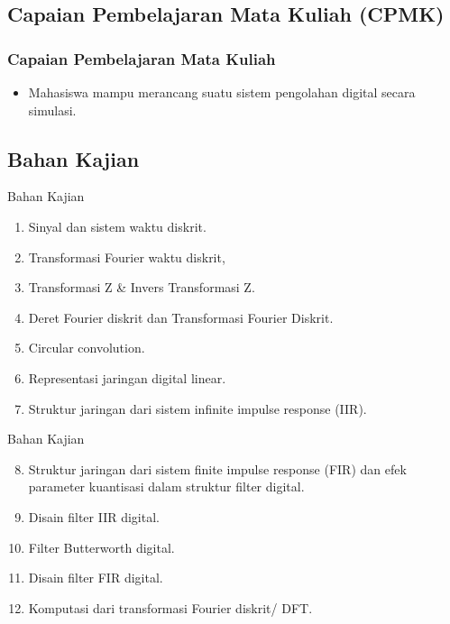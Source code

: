 \documentclass[pdflatex,compress]{beamer}
\begin{document}
\subsection{Capaian Pembelajaran Mata Kuliah (CPMK)}

\begin{frame}
	\frametitle{Capaian Pembelajaran Mata Kuliah}
	\begin{itemize}
		\item Mahasiswa mampu merancang suatu sistem pengolahan digital secara simulasi.
	\end{itemize}
\end{frame}

\subsection{Bahan Kajian}

\begin{frame}{Bahan Kajian}
	\begin{enumerate}
		\item Sinyal dan sistem waktu diskrit.
		\item Transformasi Fourier waktu diskrit,
		\item Transformasi Z \& Invers Transformasi Z.
		\item Deret Fourier diskrit dan Transformasi Fourier Diskrit.
		\item Circular convolution.
		\item Representasi jaringan digital linear.
		\item Struktur jaringan dari sistem infinite impulse response (IIR).
	\end{enumerate}
\end{frame}

\begin{frame}{Bahan Kajian}
	\begin{enumerate}
		\setcounter{enumi}{7}
		\item Struktur jaringan dari sistem finite impulse response (FIR) dan efek parameter kuantisasi dalam struktur filter digital.
		\item Disain filter IIR digital.
		\item Filter Butterworth digital.
		\item Disain filter FIR digital.
		\item Komputasi dari transformasi Fourier diskrit/ DFT.
	\end{enumerate}
\end{frame}
\end{document}
